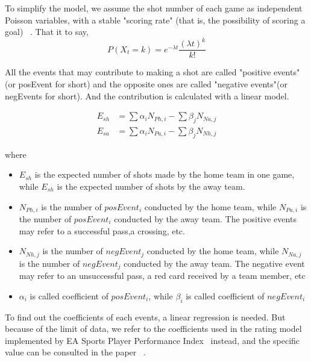 \documentclass[12pt]{mcmthesis}
\begin{document}
To simplify the model, we assume the shot number of each game as independent Poisson variables, with a stable "scoring rate" (that is, the possibility of scoring a goal) ~\cite{development}. That it to say,
\begin{equation}
P(X_t=k) = e^{-\lambda t} \frac{(\lambda t)^k}{k!}
\end{equation}

All the events that may contribute to making a shot are called "positive events"(or posEvent for short) and the opposite ones are called "negative events"(or negEvents for short). And the contribution is calculated with a linear model.

\begin{equation}
\begin{aligned}
E_{sh} &= \sum{\alpha _i N_{Ph,i}} - \sum{\beta _j N_{Na,j}}\nonumber\\
E_{sa} &= \sum{\alpha _i N_{Pa,i}} - \sum{\beta _j N_{Nh,j}}\nonumber
\end{aligned}
\end{equation}

where 

\begin{itemize}
	\item $E_{sh}$ is the expected number of shots made by the home team in one game, while $E_{sh}$ is the expected number of shots by the away team.
	\item $N_{Ph,i}$ is the number of $posEvent_i$ conducted by the home team, while $N_{Pa,i}$ is the number of $posEvent_i$ conducted by the away team. The positive events may refer to a successful pass,a crossing, etc.
	\item $N_{Nh,j}$ is the number of $negEvent_j$ conducted by the home team, while $N_{Na,j}$ is the number of $negEvent_j$ conducted by the away team. The negative event may refer to an unsuccessful pass, a red card received by a team member, etc
	\item $\alpha _i$ is called coefficient of $posEvent_i$, while $\beta _i$ is called coefficient of $negEvent_i$
\end{itemize}

To find out the coefficients of each events, a linear regression is needed. But because of the limit of data, we refer to the coefficients used in the rating model implemented by EA Sports Player Performance Index~\cite{development} instead, and the specific value can be consulted in the paper~\cite{development} .
\end{document}
